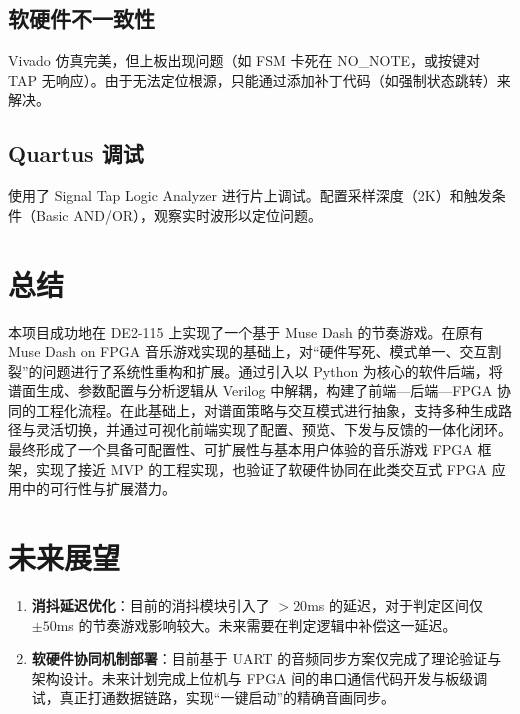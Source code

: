 \documentclass[12pt, a4paper]{article}
\begin{document}
\subsection{软硬件不一致性}
Vivado 仿真完美，但上板出现问题（如 FSM 卡死在 NO\_NOTE，或按键对 TAP 无响应）。由于无法定位根源，只能通过添加补丁代码（如强制状态跳转）来解决。

\subsection{Quartus 调试}
使用了 Signal Tap Logic Analyzer 进行片上调试。配置采样深度（2K）和触发条件（Basic AND/OR），观察实时波形以定位问题。

\section{总结}
本项目成功地在 DE2-115 上实现了一个基于 Muse Dash 的节奏游戏。在原有 Muse Dash on FPGA 音乐游戏实现的基础上，对“硬件写死、模式单一、交互割裂”的问题进行了系统性重构和扩展。通过引入以 Python 为核心的软件后端，将谱面生成、参数配置与分析逻辑从 Verilog 中解耦，构建了前端—后端—FPGA 协同的工程化流程。在此基础上，对谱面策略与交互模式进行抽象，支持多种生成路径与灵活切换，并通过可视化前端实现了配置、预览、下发与反馈的一体化闭环。最终形成了一个具备可配置性、可扩展性与基本用户体验的音乐游戏 FPGA 框架，实现了接近 MVP 的工程实现，也验证了软硬件协同在此类交互式 FPGA 应用中的可行性与扩展潜力。


\section{未来展望}
\begin{enumerate}
    \item \textbf{消抖延迟优化}：目前的消抖模块引入了 $>20$ms 的延迟，对于判定区间仅 $\pm 50$ms 的节奏游戏影响较大。未来需要在判定逻辑中补偿这一延迟。
    \item \textbf{软硬件协同机制部署}：目前基于 UART 的音频同步方案仅完成了理论验证与架构设计。未来计划完成上位机与 FPGA 间的串口通信代码开发与板级调试，真正打通数据链路，实现“一键启动”的精确音画同步。
\end{enumerate}
\end{document}
